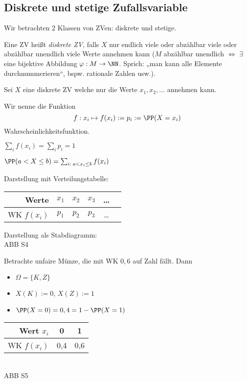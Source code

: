 \subsection{Diskrete und stetige Zufallsvariable}
Wir betrachten 2 Klassen von ZVen: diskrete und stetige.

 Eine ZV heißt \emph{diskrete ZV}, falls $X$ nur endlich viele oder abzählbar viele oder abzählbar unendlich viele Werte annehmen kann ($M$ abzählbar unendlich $\Leftrightarrow$ $\exists$ eine bijektive Abbildung $\varphi: M \to \NN$. Sprich: „man kann alle Elemente durchnummerieren“, bspw. rationale Zahlen usw.).


 Sei $X$ eine diskrete ZV welche nur die Werte $x_1, x_2 , \dots$ annehmen kann.
\begin{anumerate}
\item Wir nenne die Funktion
$$f: x_i\mapsto f(x_i):=p_i:= \PP(X=x_i)$$
Wahrscheinlichkeitsfunktion.
\item $\sum_i f(x_i)=\sum_i p_i =1$
\item $\PP(a < X \leq b) = \sum_{i:\; a<x_i \leq b} f(x_i)$
\item Darstellung mit Verteilungstabelle:\\
\begin{tabular}{r | c | c | c | c | c}
Werte & $x_1$ & $x_2$ & $x_3$& …\\
\hline
WK $f(x_i)$ & $p_1$ & $p_2$ & $p_3$ & …
\end{tabular}
\item Darstellung als Stabdiagramm:\\
ABB S4
\end{anumerate}

 Betrachte unfaire Münze, die mit WK $0,6$ auf Zahl fällt. Dann
\begin{itemize}
\item $\Omega = \{ K, Z\}$
\item $X(K):=0$, $X(Z):=1$
\item $\PP(X=0)=0,4=1-\PP(X=1)$
\end{itemize}
\begin{tabular}{r | c | c}
Wert $x_i$ & 0 & 1\\
\hline 
WK $f(x_i)$ & 0,4 & 0,6
\end{tabular}\\
ABB S5

